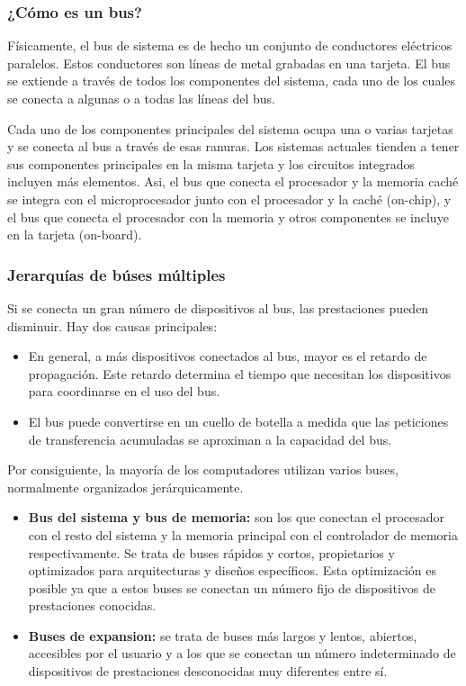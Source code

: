 \subsubsection{¿Cómo es un bus?}

Físicamente, el bus de sistema es de hecho un conjunto de conductores eléctricos paralelos. Estos conductores son líneas de metal grabadas en una tarjeta. El bus se extiende a través de todos los componentes del sistema, cada uno de los cuales se conecta a algunas o a todas las líneas del bus.

Cada uno de los componentes principales del sistema ocupa una o varias tarjetas y se conecta al bus a través de esas ranuras. Los sistemas actuales tienden a tener sus componentes principales en la misma tarjeta y los circuitos integrados incluyen más elementos. Asi, el bus que conecta el procesador y la memoria caché se integra con el microprocesador junto con el procesador y la caché (on-chip), y el bus que conecta el procesador con la memoria y otros componentes se incluye en la tarjeta (on-board).

\subsubsection{Jerarquías de búses múltiples}

Si se conecta un gran número de dispositivos al bus, las prestaciones pueden disminuir. Hay dos causas principales:

\begin{itemize}
  \item En general, a más dispositivos conectados al bus, mayor es el retardo de propagación. Este retardo determina el tiempo que necesitan los dispositivos para coordinarse en el uso del bus.
  \item El bus puede convertirse en un cuello de botella a medida que las peticiones de transferencia acumuladas se aproximan a la capacidad del bus.
\end{itemize}

Por consiguiente, la mayoría de los computadores utilizan varios buses, normalmente organizados jerárquicamente. 

\begin{itemize}
  \item \textbf{Bus del sistema y bus de memoria:} son los que conectan el procesador con el resto del sistema y la memoria principal con el controlador de memoria respectivamente. Se trata de buses rápidos y cortos, propietarios y optimizados para arquitecturas y diseños específicos. Esta optimización es posible ya que a estos buses se conectan un número fijo de dispositivos de prestaciones conocidas.
  \item \textbf{Buses de expansion:} se trata de buses más largos y lentos, abiertos, accesibles por el usuario y a los que se conectan un número indeterminado de dispositivos de prestaciones desconocidas muy diferentes entre sí.
\end{itemize}

